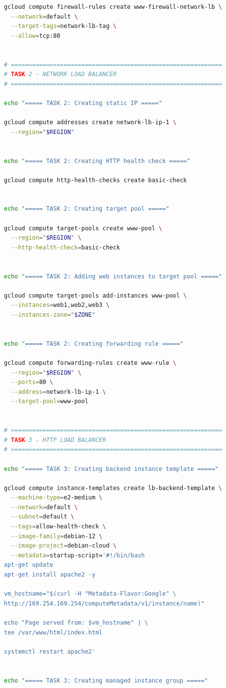 \documentclass{article}
\begin{document}
\begin{lstlisting}[language=bash]
gcloud compute firewall-rules create www-firewall-network-lb \
  --network=default \
  --target-tags=network-lb-tag \
  --allow=tcp:80


# ============================================================
# TASK 2 - NETWORK LOAD BALANCER
# ============================================================

echo "===== TASK 2: Creating static IP ====="

gcloud compute addresses create network-lb-ip-1 \
  --region="$REGION"


echo "===== TASK 2: Creating HTTP health check ====="

gcloud compute http-health-checks create basic-check


echo "===== TASK 2: Creating target pool ====="

gcloud compute target-pools create www-pool \
  --region="$REGION" \
  --http-health-check=basic-check


echo "===== TASK 2: Adding web instances to target pool ====="

gcloud compute target-pools add-instances www-pool \
  --instances=web1,web2,web3 \
  --instances-zone="$ZONE"


echo "===== TASK 2: Creating forwarding rule ====="

gcloud compute forwarding-rules create www-rule \
  --region="$REGION" \
  --ports=80 \
  --address=network-lb-ip-1 \
  --target-pool=www-pool


# ============================================================
# TASK 3 - HTTP LOAD BALANCER
# ============================================================

echo "===== TASK 3: Creating backend instance template ====="

gcloud compute instance-templates create lb-backend-template \
  --machine-type=e2-medium \
  --network=default \
  --subnet=default \
  --tags=allow-health-check \
  --image-family=debian-12 \
  --image-project=debian-cloud \
  --metadata=startup-script='#!/bin/bash
apt-get update
apt-get install apache2 -y

vm_hostname="$(curl -H "Metadata-Flavor:Google" \
http://169.254.169.254/computeMetadata/v1/instance/name)"

echo "Page served from: $vm_hostname" | \
tee /var/www/html/index.html

systemctl restart apache2'


echo "===== TASK 3: Creating managed instance group ====="


\end{lstlisting}
\end{document}
